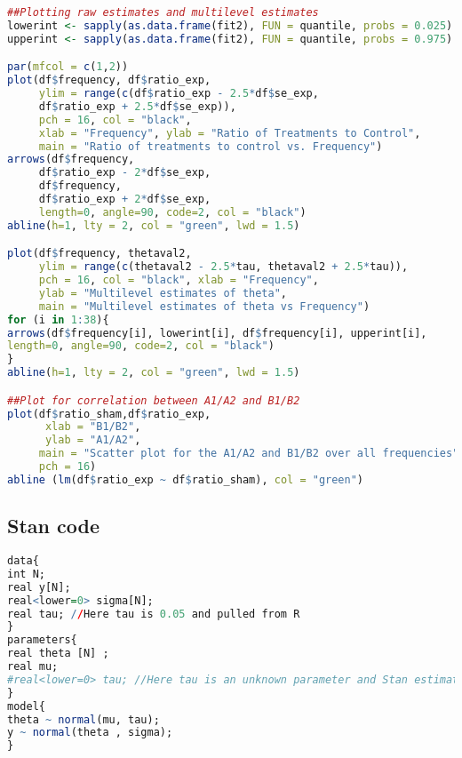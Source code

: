 \documentclass{article}
\begin{document}
\begin{lstlisting}[language=R]
##Plotting raw estimates and multilevel estimates
lowerint <- sapply(as.data.frame(fit2), FUN = quantile, probs = 0.025)
upperint <- sapply(as.data.frame(fit2), FUN = quantile, probs = 0.975)

par(mfcol = c(1,2))
plot(df$frequency, df$ratio_exp,
     ylim = range(c(df$ratio_exp - 2.5*df$se_exp, 
     df$ratio_exp + 2.5*df$se_exp)),
     pch = 16, col = "black", 
     xlab = "Frequency", ylab = "Ratio of Treatments to Control",
     main = "Ratio of treatments to control vs. Frequency")
arrows(df$frequency, 
     df$ratio_exp - 2*df$se_exp, 
     df$frequency, 
     df$ratio_exp + 2*df$se_exp, 
     length=0, angle=90, code=2, col = "black")
abline(h=1, lty = 2, col = "green", lwd = 1.5)

plot(df$frequency, thetaval2,
     ylim = range(c(thetaval2 - 2.5*tau, thetaval2 + 2.5*tau)),
     pch = 16, col = "black", xlab = "Frequency", 
     ylab = "Multilevel estimates of theta",
     main = "Multilevel estimates of theta vs Frequency")
for (i in 1:38){
arrows(df$frequency[i], lowerint[i], df$frequency[i], upperint[i], 
length=0, angle=90, code=2, col = "black")
}
abline(h=1, lty = 2, col = "green", lwd = 1.5)

##Plot for correlation between A1/A2 and B1/B2
plot(df$ratio_sham,df$ratio_exp, 
      xlab = "B1/B2", 
      ylab = "A1/A2", 
     main = "Scatter plot for the A1/A2 and B1/B2 over all frequencies",
     pch = 16)
abline (lm(df$ratio_exp ~ df$ratio_sham), col = "green")
\end{lstlisting}
\newpage

\subsection{Stan code}
\begin{lstlisting}[language=R]
data{
int N;
real y[N];
real<lower=0> sigma[N]; 
real tau; //Here tau is 0.05 and pulled from R
}
parameters{
real theta [N] ; 
real mu; 
#real<lower=0> tau; //Here tau is an unknown parameter and Stan estimates it 
}                                               
model{
theta ~ normal(mu, tau); 
y ~ normal(theta , sigma);
}
\end{lstlisting}
\end{document}
